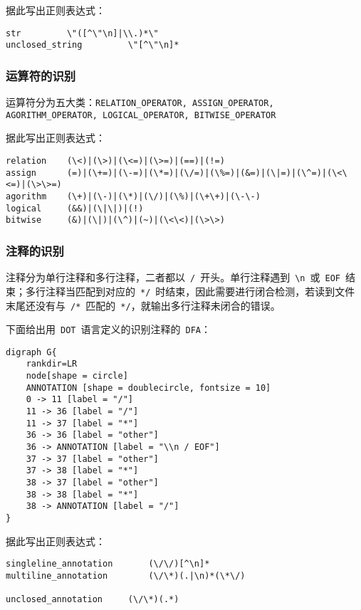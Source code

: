 \documentclass[lang=cn,11pt,a4paper]{paper}
\begin{document}
据此写出正则表达式：

\begin{lstlisting}
str			\"([^\"\n]|\\.)*\"
unclosed_string			\"[^\"\n]*
\end{lstlisting}

\subsubsection{运算符的识别}

运算符分为五大类：\lstinline{RELATION_OPERATOR, ASSIGN_OPERATOR, AGORITHM_OPERATOR, LOGICAL_OPERATOR, BITWISE_OPERATOR}

据此写出正则表达式：

\begin{lstlisting}
relation	(\<)|(\>)|(\<=)|(\>=)|(==)|(!=)
assign 		(=)|(\+=)|(\-=)|(\*=)|(\/=)|(\%=)|(&=)|(\|=)|(\^=)|(\<\<=)|(\>\>=)
agorithm 	(\+)|(\-)|(\*)|(\/)|(\%)|(\+\+)|(\-\-)
logical		(&&)|(\|\|)|(!)
bitwise		(&)|(\|)|(\^)|(~)|(\<\<)|(\>\>)
\end{lstlisting}

\subsubsection{注释的识别}

注释分为单行注释和多行注释，二者都以\ \lstinline{/}\ 开头。单行注释遇到\ \lstinline{\n}\ 或\ \lstinline{EOF}\ 结束；多行注释当匹配到对应的\ \lstinline{*/}\ 时结束，因此需要进行闭合检测，若读到文件末尾还没有与\ \lstinline{/*}\ 匹配的\ \lstinline{*/}，就输出多行注释未闭合的错误。

下面给出用\ \lstinline{DOT}\ 语言定义的识别注释的\ \lstinline{DFA}：

\begin{lstlisting}
digraph G{
    rankdir=LR
    node[shape = circle]
    ANNOTATION [shape = doublecircle, fontsize = 10]
    0 -> 11 [label = "/"]
    11 -> 36 [label = "/"]
    11 -> 37 [label = "*"]
    36 -> 36 [label = "other"]
    36 -> ANNOTATION [label = "\\n / EOF"]
    37 -> 37 [label = "other"]
    37 -> 38 [label = "*"]
    38 -> 37 [label = "other"]
    38 -> 38 [label = "*"]
    38 -> ANNOTATION [label = "/"]
}
\end{lstlisting}

据此写出正则表达式：

\begin{lstlisting}
singleline_annotation		(\/\/)[^\n]*
multiline_annotation		(\/\*)(.|\n)*(\*\/)

unclosed_annotation		(\/\*)(.*)
\end{lstlisting}
\end{document}
